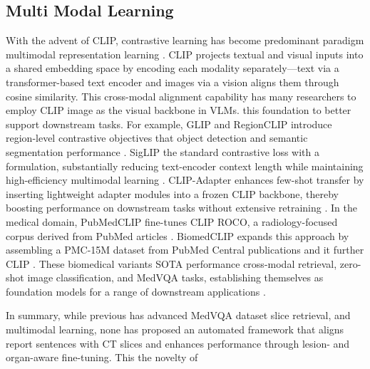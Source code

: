 \documentclass[bioengineering,article,submit,pdftex,moreauthors]{Definitions/mdpi}
\begin{document}
\subsection{Multi Modal Learning}
With the advent of CLIP, contrastive learning has become  predominant paradigm  multimodal representation learning \cite{radford_learning_2021}. 
CLIP projects textual and visual inputs into a shared embedding space by encoding each modality separately—text via a transformer-based text encoder and images via a vision  aligns them through cosine similarity. 
This cross-modal alignment capability has  many researchers to employ CLIP image  as the visual backbone in VLMs. 
   this foundation to better support downstream tasks. For example, GLIP and RegionCLIP introduce region-level contrastive objectives that  object detection and semantic segmentation performance \cite{li_grounded_2022,zhong_regionclip_2022}.
SigLIP  the standard contrastive loss with a  formulation, substantially reducing text-encoder context length while maintaining high-efficiency multimodal learning \cite{zhai_sigmoid_2023}. 
CLIP-Adapter enhances few-shot transfer by inserting lightweight adapter modules into a frozen CLIP backbone, thereby boosting performance on downstream tasks without extensive retraining \cite{gao_clip-adapter_2024}. 
In the medical domain, PubMedCLIP fine-tunes CLIP  ROCO, a radiology-focused corpus derived from PubMed articles \cite{eslami_pubmedclip_2023,pelka_radiology_2018}. 
BiomedCLIP expands this approach by assembling a PMC-15M dataset from PubMed Central publications and  it  further CLIP \cite{zhang_biomedclip_2025}. 
These biomedical variants  SOTA performance  cross-modal retrieval, zero-shot image classification, and MedVQA tasks, establishing themselves as foundation models for a  range of downstream  applications \cite{koleilat_medclip-sam_2024,zhao_foundation_2024,polis_exploring_2025}.


In summary, while previous  has advanced MedVQA dataset  slice retrieval, and multimodal learning, none has proposed an automated framework that aligns report sentences with CT slices and enhances performance through lesion- and organ-aware fine-tuning. This  the novelty of  
\end{document}
